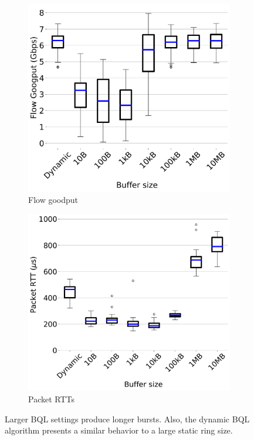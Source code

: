 \begin{figure}[t]
\begin{subfigure}[t]{.22\linewidth}
		\centering\includegraphics[width=1\linewidth]{figs/tso_gput.pdf}
        \vspace{-2mm}
		\caption{Flow goodput}
		\label{fig:offload_latency1}
	\end{subfigure}
	\begin{subfigure}[t]{.22\linewidth}
		\centering\includegraphics[width=1\linewidth]{figs/tso_rtt.pdf}
        \vspace{-2mm}
		\caption{Packet RTTs}
		\label{fig:offload_latency2}
	\end{subfigure}
	\caption{\small{Larger BQL settings produce longer bursts. Also, the dynamic BQL algorithm presents a similar behavior to a large static ring size.}}
		\label{fig:bql_all}
\vspace{-2mm}
\end{figure}

